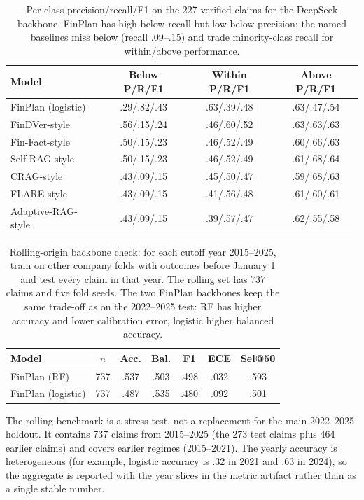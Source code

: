 \documentclass[11pt]{article}
\begin{document}
\begin{table}[t]
\centering
\scriptsize
\setlength{\tabcolsep}{2pt}
\begin{tabular}{lccc}
\toprule
Model & Below P/R/F1 & Within P/R/F1 & Above P/R/F1 \\
\midrule
FinPlan (logistic) & .29/.82/.43 & .63/.39/.48 & .63/.47/.54 \\
FinDVer-style & .56/.15/.24 & .46/.60/.52 & .63/.63/.63 \\
Fin-Fact-style & .50/.15/.23 & .46/.52/.49 & .60/.66/.63 \\
Self-RAG-style & .50/.15/.23 & .46/.52/.49 & .61/.68/.64 \\
CRAG-style & .43/.09/.15 & .45/.50/.47 & .59/.68/.63 \\
FLARE-style & .43/.09/.15 & .41/.56/.48 & .61/.60/.61 \\
Adaptive-RAG-style & .43/.09/.15 & .39/.57/.47 & .62/.55/.58 \\
\bottomrule
\end{tabular}
\caption{Per-class precision/recall/F1 on the 227 verified claims for the DeepSeek backbone. FinPlan has high below recall but low below precision; the named baselines miss below (recall .09--.15) and trade minority-class recall for within/above performance.}
\label{tab:per-class}
\end{table}

\begin{table}[t]
\centering
\footnotesize
\setlength{\tabcolsep}{1.5pt}
\begin{tabular}{lcccccc}
\toprule
Model & $n$ & Acc. & Bal. & F1 & ECE & Sel@50 \\
\midrule
FinPlan (RF) & 737 & .537 & .503 & .498 & .032 & .593 \\
FinPlan (logistic) & 737 & .487 & .535 & .480 & .092 & .501 \\
\bottomrule
\end{tabular}
\caption{Rolling-origin backbone check: for each cutoff year 2015--2025, train on other company folds with outcomes before January 1 and test every claim in that year. The rolling set has 737 claims and five fold seeds. The two FinPlan backbones keep the same trade-off as on the 2022--2025 test: RF has higher accuracy and lower calibration error, logistic higher balanced accuracy.}
\label{tab:rolling}
\end{table}

The rolling benchmark is a stress test, not a replacement for the main
2022--2025 holdout. It contains 737 claims from 2015--2025 (the 273 test claims
plus 464 earlier claims) and covers earlier regimes (2015--2021). The yearly
accuracy is heterogeneous (for example, logistic accuracy is .32 in 2021 and
.63 in 2024), so the aggregate is reported with the year slices in the metric
artifact rather than as a single stable number.
\end{document}
